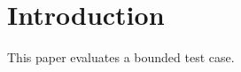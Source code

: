 \documentclass{article}
\begin{document}
\section{Introduction}
This paper evaluates a bounded test case.
\end{document}
